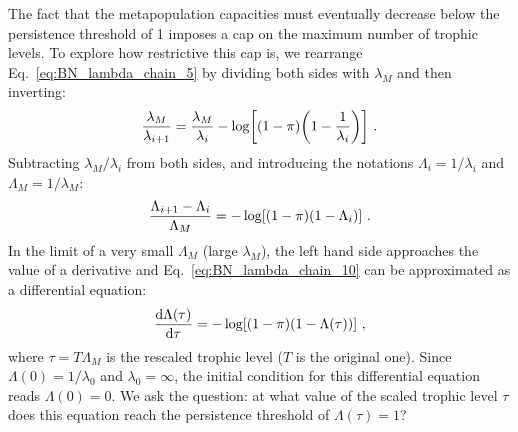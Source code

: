 \documentclass[11pt]{article}
\newcommand{\ud}{\text{d}}
\let\originalleft\left
\let\originalright\right
\renewcommand{\left}{\mathopen{}\mathclose\bgroup\originalleft}
\renewcommand{\right}{\aftergroup\egroup\originalright}
\begin{document}
The fact that the metapopulation capacities must eventually decrease below the persistence threshold of 1 imposes a cap on the maximum number of trophic levels. To explore how restrictive this cap is, we rearrange Eq.~\ref{eq:BN_lambda_chain_5} by dividing both sides with $\lambda_M$ and then inverting:
\begin{equation}
  \label{eq:BN_lambda_chain_9}
  \frac{\lambda_M}{\lambda_{i+1}} = \frac{\lambda_M}{\lambda_i} -
  \log \left[ (1 - \pi) \left( 1 - \frac{1}{\lambda_i} \right) \right] \ .
\end{equation}
Subtracting $\lambda_M/\lambda_i$ from both sides, and introducing the notations $\Lambda_i = 1/\lambda_i$ and $\Lambda_M = 1/\lambda_M$:
\begin{equation}
  \label{eq:BN_lambda_chain_10}
  \frac{\Lambda_{i+1} - \Lambda_i}{\Lambda_M} =
  - \log \left[ (1 - \pi) (1 - \Lambda_i) \right] \ .
\end{equation}
In the limit of a very small $\Lambda_M$ (large $\lambda_M$), the left hand side approaches the value of a derivative and Eq.~\ref{eq:BN_lambda_chain_10} can be approximated as a differential equation:
\begin{equation}
  \label{eq:BN_lambda_chain_11}
  \frac{\ud \Lambda(\tau)}{\ud \tau} =
  - \log \left[ (1 - \pi) (1 - \Lambda(\tau)) \right] \ ,
\end{equation}
where $\tau = T \Lambda_M$ is the rescaled trophic level ($T$ is the original one). Since $\Lambda(0) = 1/\lambda_0$ and $\lambda_0 = \infty$, the initial condition for this differential equation reads $\Lambda(0) = 0$. We ask the question: at what value of the scaled trophic level $\tau$ does this equation reach the persistence threshold of $\Lambda(\tau) = 1$?
\end{document}
